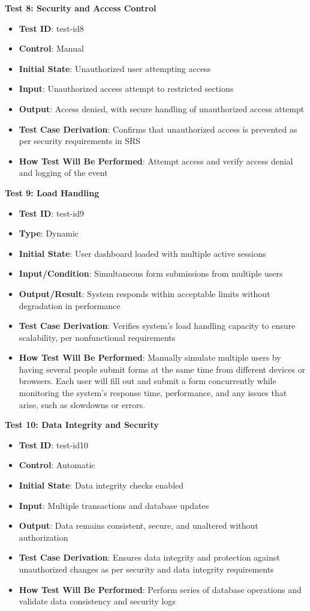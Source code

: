 \documentclass[12pt, titlepage]{article}
\begin{document}
\textbf{Test 8: Security and Access Control}
\begin{itemize}
    \item \textbf{Test ID}: test-id8
    \item \textbf{Control}: Manual
    \item \textbf{Initial State}: Unauthorized user attempting access
    \item \textbf{Input}: Unauthorized access attempt to restricted sections
    \item \textbf{Output}: Access denied, with secure handling of unauthorized access attempt
    \item \textbf{Test Case Derivation}: Confirms that unauthorized access is prevented as per security requirements in SRS
    \item \textbf{How Test Will Be Performed}: Attempt access and verify access denial and logging of the event
\end{itemize}
\textbf{Test 9: Load Handling}
\begin{itemize}
    \item \textbf{Test ID}: test-id9
    \item \textbf{Type}: Dynamic
    \item \textbf{Initial State}: User dashboard loaded with multiple active sessions
    \item \textbf{Input/Condition}: Simultaneous form submissions from multiple users
    \item \textbf{Output/Result}: System responds within acceptable limits without degradation in performance
    \item \textbf{Test Case Derivation}: Verifies system’s load handling capacity to ensure scalability, per nonfunctional requirements
    \item \textbf{How Test Will Be Performed}: Manually simulate multiple users by having several people submit forms at the same time from different devices or browsers. Each user will fill out and submit a form concurrently while monitoring the system's response time, performance, and any issues that arise, such as slowdowns or errors.
\end{itemize}

\textbf{Test 10: Data Integrity and Security}
\begin{itemize}
    \item \textbf{Test ID}: test-id10
    \item \textbf{Control}: Automatic
    \item \textbf{Initial State}: Data integrity checks enabled
    \item \textbf{Input}: Multiple transactions and database updates
    \item \textbf{Output}: Data remains consistent, secure, and unaltered without authorization
    \item \textbf{Test Case Derivation}: Ensures data integrity and protection against unauthorized changes as per security and data integrity requirements
    \item \textbf{How Test Will Be Performed}: Perform series of database operations and validate data consistency and security logs
\end{itemize} 
\end{document}

